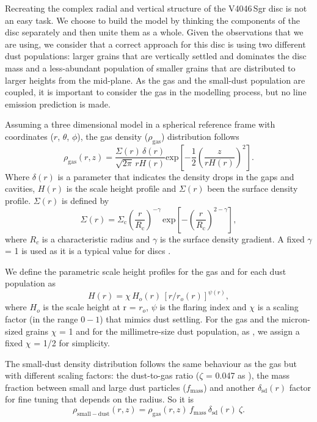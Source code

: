 \documentclass[letters,usenatbib,times]{mnras}
\begin{document}
Recreating the complex radial and vertical structure of the V4046\,Sgr disc is not an easy task. We choose to build the model by thinking the components of the disc separately and then unite them as a whole. Given the observations that we are using, we consider that a correct approach for this disc is using two different dust populations: larger grains that are vertically settled and dominates the disc mass and a less-abundant population of smaller grains that are distributed to larger heights from the mid-plane. As the gas and the small-dust population are coupled, it is important to consider the gas in the modelling process, but no line emission prediction is made. 

Assuming a three dimensional model in a spherical reference frame with coordinates ($r$, $\theta$, $\phi$), the gas density ($\rho_{\mathrm{gas}}$) distribution follows
\begin{equation}
  \rho_{\mathrm{gas}}(r,z) =\frac{\Sigma(r) \,\delta(r)}{\sqrt{2\pi} \,r H(r)}  \mathrm{exp}\left[-\frac{1}{2} \left(\frac{z}{r H(r)}\right)^2\right].
\end{equation}
Where $\delta(r)$ is a parameter that indicates the density drops in the gaps and cavities, $H(r)$ is the scale height profile and $\Sigma(r)$ been the surface density profile. $\Sigma(r)$ is defined by
\begin{equation}
  \Sigma(r) = \Sigma_\mathrm{c} \left(\frac{r}{R_\mathrm{c}}\right)^{-\gamma}  \, \mathrm{exp}\left[-\left(\frac{r}{R_\mathrm{c}}\right)^{2-\gamma}\right],
\end{equation}
where $R_c$ is a characteristic radius and $\gamma$ is the surface density gradient. A fixed $\gamma$ = 1 is used as it is a typical value for discs \citep{Andrews_2009,Andrews_2010}. 

We define the parametric scale height profiles for the gas and for each dust population as
\begin{equation}
    \label{scale}
  H(r)=\chi \, H_{o}(r) \, [r/r_{o}(r)]^{\psi(r)},
\end{equation}
where $H_o$ is the scale height at r = $r_o$, $\psi$ is the flaring index and $\chi$ is a scaling factor (in the range $0-1$) that mimics dust settling. For the gas and the micron-sized grains $\chi$ = 1 and for the millimetre-size dust population, as \citet{Rosenfeld_2013}, we assign a fixed $\chi$ = 1/2 for simplicity.

The small-dust density distribution follows the same behaviour as the gas but with different scaling factors: the dust-to-gas ratio ($\zeta$ = 0.047 as \citet{Rosenfeld_2013}), the mass fraction between small and large dust particles ($f_{\mathrm{mass}}$) and another $\delta_{\mathrm{sd}}(r)$ factor for fine tuning that depends on the radius. So it is
\begin{equation}
\rho_{\mathrm{small-dust}}(r,z)=\rho_{\mathrm{gas}}(r,z)\, f_{\mathrm{mass}} \, \delta_{\mathrm{sd}}(r) \: \zeta .
\end{equation}
\end{document}
